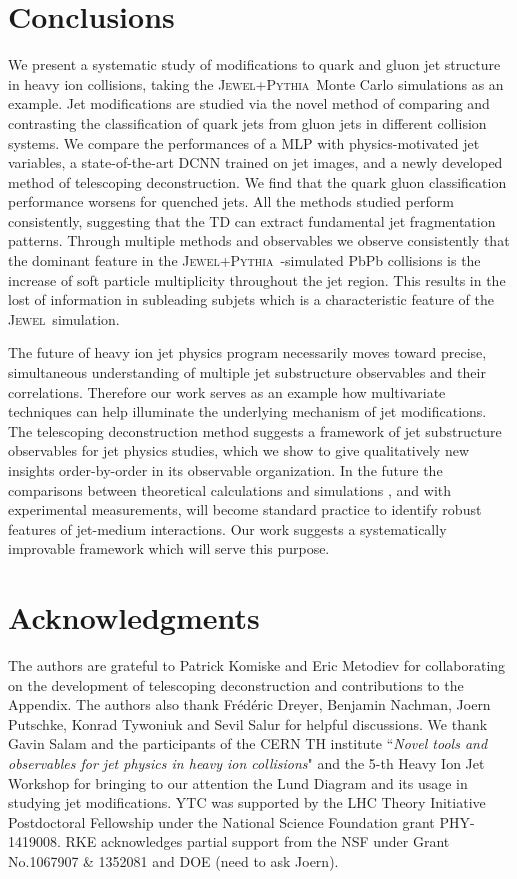 \documentclass[notoc]{JHEP3}
\newcommand{\jw}{\textsc{Jewel}~}
\newcommand{\jwpy}{\textsc{Jewel+Pythia}~}
\begin{document}
\section{Conclusions}
\label{sec:conc}

We present a systematic study of modifications to quark and gluon jet structure in heavy ion collisions, taking the \jwpy Monte Carlo simulations as an example. Jet modifications are studied via the novel method of comparing and contrasting the classification of quark jets from gluon jets in different collision systems. We compare the performances of a MLP with physics-motivated jet variables, a state-of-the-art DCNN trained on jet images, and a newly developed method of telescoping deconstruction. We find that the quark gluon classification performance worsens for quenched jets. All the methods studied perform consistently, suggesting that the TD can extract fundamental jet fragmentation patterns. Through multiple methods and observables we observe consistently that the dominant feature in the \jwpy-simulated PbPb collisions is the increase of soft particle multiplicity throughout the jet region. This results in the lost of information in subleading subjets which is a characteristic feature of the \jw simulation.

The future of heavy ion jet physics program necessarily moves toward precise, simultaneous understanding of multiple jet substructure observables and their correlations. Therefore our work serves as an example how multivariate techniques can help illuminate the underlying mechanism of jet modifications. The telescoping deconstruction method suggests a framework of jet substructure observables for jet physics studies, which we show to give qualitatively new insights order-by-order in its observable organization. In the future the comparisons between theoretical calculations and simulations \cite{}, and with experimental measurements, will become standard practice to identify robust features of jet-medium interactions. Our work suggests a systematically improvable framework which will serve this purpose.

\section*{Acknowledgments}
The authors are grateful to Patrick Komiske and Eric Metodiev for collaborating on the development of telescoping deconstruction and contributions to the Appendix. The authors also thank Fr\'ed\'eric Dreyer, Benjamin Nachman, Joern Putschke, Konrad Tywoniuk and Sevil Salur for helpful discussions. We thank Gavin Salam and the participants of the CERN TH institute ``{\sl Novel tools and observables for jet physics in heavy ion collisions}" and the 5-th Heavy Ion Jet Workshop for bringing to our attention the Lund Diagram and its usage in studying jet modifications. YTC was supported by the LHC Theory Initiative Postdoctoral Fellowship under the National Science Foundation grant PHY-1419008. RKE acknowledges partial support from the NSF under Grant No.1067907 \& 1352081 and DOE (need to ask Joern).
\end{document}
